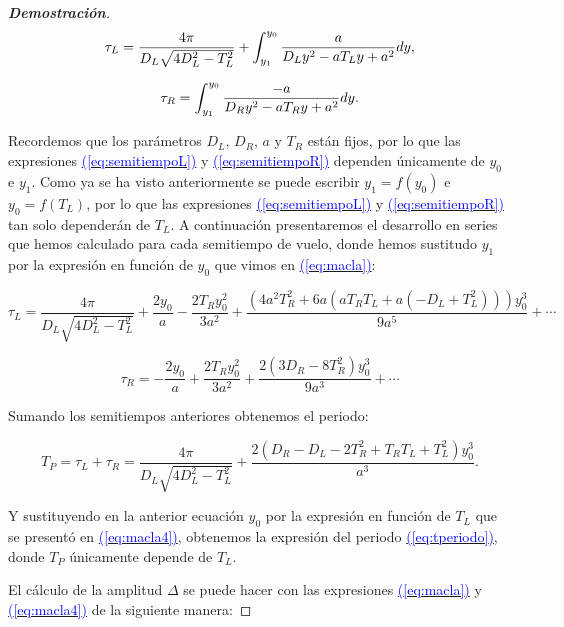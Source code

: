 \documentclass[12pt,a4paper]{report} %
\newcommand{\eref}[1]{\hyperref[#1]{\textcolor{blue}{(\ref*{#1})}}}
\newcommand{\eref}[1]{\hyperref[#1]{\textcolor{blue}{\textit{(\ref*{#1})}}}}
\begin{document}
\begin{proof}[\textbf{Demostración}]
		\begin{equation}
			\label{eq:semitiempoL}
			\scalebox{1}{$\displaystyle
				\tau_L=\frac{4\pi}{D_L\sqrt{4D_L^2-T_L^2}}+\int_{y_1}^{y_0}\frac{a}{D_Ly^2-aT_Ly+a^2}dy,
				$}
		\end{equation}\smallskip
		
		\begin{equation}
			\label{eq:semitiempoR}
			\scalebox{1}{$\displaystyle
				\tau_R=\int_{y_1}^{y_0}\frac{-a}{D_Ry^2-aT_Ry+a^2}dy.
				$}
		\end{equation}\smallskip
	
	\noindent Recordemos que los parámetros $D_L$, $D_R$, $a$ y $T_R$ están fijos, por lo que las expresiones \eref{eq:semitiempoL} y \eref{eq:semitiempoR} dependen únicamente de $y_0$ e $y_1$. Como ya se ha visto  anteriormente se puede escribir $y_1=f(y_0)$ e $y_0=f(T_L)$, por lo que las expresiones \eref{eq:semitiempoL} y \eref{eq:semitiempoR} tan solo dependerán de $T_L$. A continuación presentaremos el desarrollo en series que hemos calculado para cada semitiempo de vuelo, donde hemos sustitudo $y_1$ por la expresión en función de $y_0$ que vimos en \eref{eq:macla}:
	
	\begin{equation}
		\label{eq:seriestL}
		\tau_L=\frac{4\pi}{D_L\sqrt{4D_L^2-T_L^2}}+\frac{2y_0}{a}-\frac{2T_Ry_0^2}{3a^2}+\frac{(4a^2T_R^2+6a(aT_RT_L+a(-D_L+T_L^2)))y_0^3}{9a^5}+\cdots
	\end{equation}\smallskip
	
	\begin{equation}
		\label{eq:seriestR}
		\tau_R=-\frac{2y_0}{a}+\frac{2T_Ry_0^2}{3a^2}+\frac{2(3D_R-8T_R^2)y_0^3}{9a^3}+\cdots
	\end{equation}\smallskip
	
\noindent Sumando los semitiempos anteriores obtenemos el periodo:
	
	\begin{equation}
		T_P=\tau_L + \tau_R = \frac{4\pi}{D_L\sqrt{4D_L^2-T_L^2}}+\frac{2(D_R-D_L-2T_R^2+T_RT_L+T_L^2)y_0^3}{a^3}.
	\end{equation}\smallskip
	
	\noindent Y sustituyendo en la anterior ecuación $y_0$ por la expresión en función de $T_L$ que se presentó en \eref{eq:macla4}, obtenemos la expresión del periodo \eref{eq:tperiodo}, donde $T_P$ únicamente depende de $T_L$.
	
 	\vspace{0.5cm}El cálculo de la amplitud $\varDelta$ se puede hacer con las expresiones \eref{eq:macla} y \eref{eq:macla4} de la siguiente manera:
	

\end{proof}
\end{document}
